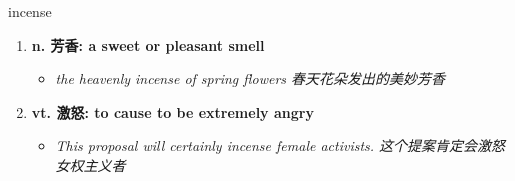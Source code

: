 
\begin{frame}
{\huge incense}
\begin{center}
\begin{enumerate}\Large
  \item \textbf{n. 芳香: a sweet or pleasant smell}
  \begin{itemize}
    \item \em{\Large{the heavenly incense of spring flowers 春天花朵发出的美妙芳香}}
  \end{itemize}
  \item \textbf{vt. 激怒: to cause to be extremely angry}
  \begin{itemize}
    \item \em{\Large{This proposal will certainly incense female activists. 这个提案肯定会激怒女权主义者}}
  \end{itemize}
\end{enumerate}
\end{center}
\end{frame}
